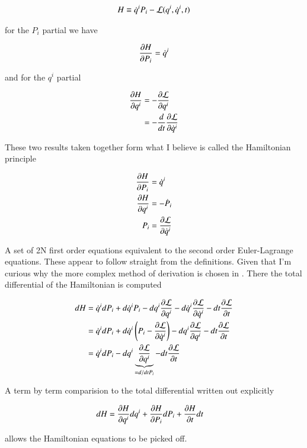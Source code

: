 \begin{align}\label{eqn:hamiltonian:hoo1}
H \equiv \qdot^i P_i -\LL(q^i, \qdot^i, t)
\end{align}

for the $P_i$ partial we have

\begin{align*}
\PD{P_i}{H} = \qdot^i
\end{align*}

and for the $q^i$ partial

\begin{align*}
\PD{q^i}{H} 
&= -\PD{q^i}{\LL} \\
&= - \frac{d}{dt} \PD{\qdot^i}{\LL} 
\end{align*}

These two results taken together form what I believe is called the Hamiltonian principle

\begin{align}\label{eqn:hamiltonian:hoo3}
\PD{P_i}{H} &= \qdot^i \\
\PD{q^i}{H} &= - \dot{P}_i \\
P_i &= \PD{\qdot^i}{\LL} 
\end{align}

A set of 2N first order equations equivalent to the second order Euler-Lagrange equations.  These appear to follow straight from the definitions.  Given that I'm curious why the more complex method of derivation is chosen in \cite{goldstein1951cm}.  There the total differential of the Hamiltonian is computed

\begin{align*}
dH &= 
\qdot^i dP_i 
+ d\qdot^i P_i 
- dq^i \PD{q^i}{\LL}
- d \qdot^i \PD{\qdot^i}{\LL}
- dt \PD{t}{\LL} \\
&= 
\qdot^i dP_i 
+ d\qdot^i \left( P_i - \PD{\qdot^i}{\LL} \right)
- dq^i \PD{q^i}{\LL}
- dt \PD{t}{\LL} \\
&= 
\qdot^i dP_i 
- dq^i \underbrace{\PD{q^i}{\LL}}_{= d/dt P_i}
- dt \PD{t}{\LL} \\
\end{align*}

A term by term comparision to the total differential written out explicitly

\begin{align}\label{eqn:hamiltonian:hoo4}
dH &= 
\PD{q^i}{H} d q^i
+\PD{P_i}{H} d P_i
+\PD{t}{H} dt
\end{align}

allows the Hamiltonian equations to be picked off.

